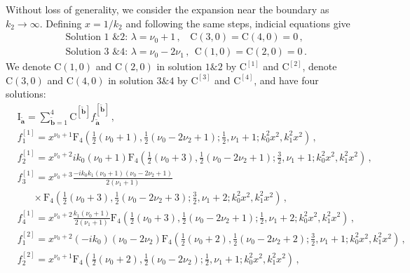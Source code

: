 \documentclass[a4paper,11pt]{article}
\newcommand{\nn}{\nonumber}
\begin{document}
Without loss of generality, we consider the expansion near the boundary as $k_2\to\infty$.
Defining $x=1/k_2$ and following the same steps, indicial equations give
\begin{align}
&\text{Solution 1 \& 2: }\lambda= \nu_0+1 \, , ~~~~ \text{C}(3,0)=\text{C}(4,0)= 0  \,, \nn\\
&\text{Solution 3 \& 4: }\lambda= \nu_0-2 \nu_1  \, , ~~ \text{C}(1,0)=\text{C}(2,0)= 0  \, . 
\end{align}
We denote $\text{C}(1,0)$ and $\text{C}(2,0)$ in solution $1\&2$ by $\text{C}^{[1]}$ and $\text{C}^{[2]}$, denote $\text{C}(3,0)$ and $\text{C}(4,0)$ in solution $3\&4$ by $\text{C}^{[3]}$ and $\text{C}^{[4]}$, and have four solutions:
\begin{align}
&\text{I}_{\tilde{\bm{a}}}= \sum_{\tilde{\bm{b}}=1}^4 \text{C}^{[\tilde{\bm{b}}]}f_{\tilde{\bm{a}}}^{[\tilde{\bm{b}}]}\, , \nn\\
&f_{1}^{[1]}=x^{\nu _0+1}
\text{F}_4\left(\frac{1}{2} \left(\nu _0+1\right),\frac{1}{2} \left(\nu _0-2 \nu _2+1\right);\frac{1}{2},\nu _1+1;k_0^2 x^2,k_1^2 x^2\right) \, , \nn\\ 
&f_{2}^{[1]}= x^{\nu _0+2} i k_0 \left(\nu _0+1\right)
\text{F}_4\left(\frac{1}{2} \left(\nu _0+3\right) , \frac{1}{2} \left(\nu _0-2 \nu _2+1\right);\frac{3}{2},\nu _1+1 ; k_0^2 x^2,k_1^2 x^2\right) \, , \nn\\ 
&f_{3}^{[1]}=x^{\nu _0+3} \frac{-i k_0 k_1 \left(\nu _0+1\right) \left(\nu _0-2 \nu _2+1\right) }{2 \left(\nu _1+1\right)} \nn\\
&~~~~~~~\times
\text{F}_4\left(\frac{1}{2} \left(\nu _0+3\right),\frac{1}{2} \left(\nu _0-2 \nu _2+3\right);\frac{3}{2},\nu _1+2;k_0^2 x^2,k_1^2 x^2\right)     \, , \nn\\ 
&f_{4}^{[1]}= x^{\nu _0+2} \frac{k_1 \left(\nu _0+1\right) }{2 \left(\nu _1+1\right)}
\text{F}_4\left(\frac{1}{2} \left(\nu _0+3\right),\frac{1}{2} \left(\nu _0-2 \nu _2+1\right);\frac{1}{2},\nu _1+2;k_0^2 x^2,k_1^2 x^2\right)   
   \, , \nn\\ 
&f_{1}^{[2]}=
x^{\nu _0+2} (-i k_0) \left(\nu _0-2 \nu _2\right) 
\text{F}_4\left(\frac{1}{2} \left(\nu _0+2\right),\frac{1}{2} \left(\nu _0-2 \nu _2+2\right);\frac{3}{2},\nu _1+1;k_0^2 x^2,k_1^2 x^2\right)      \, , \nn\\ 
&f_{2}^{[2]}=
x^{\nu _0+1}
\text{F}_4\left(\frac{1}{2} \left(\nu _0+2\right),\frac{1}{2} \left(\nu _0-2 \nu _2\right);\frac{1}{2},\nu _1+1;k_0^2 x^2,k_1^2 x^2\right)       \, , \nn\\ 

\end{align}
\end{document}
